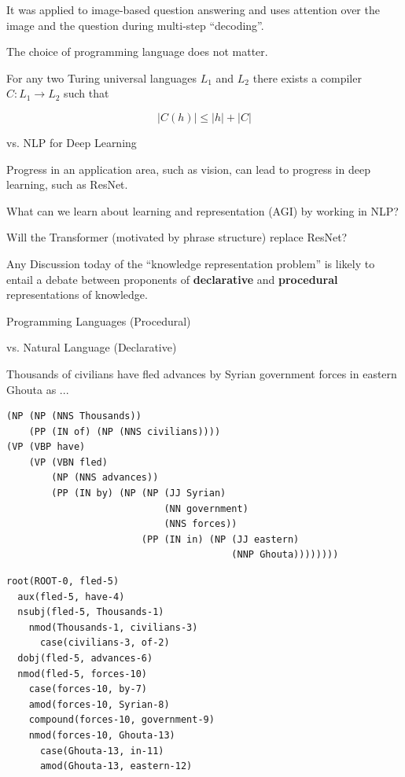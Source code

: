 {\vfill
It was applied to image-based question answering and uses attention over the image and the question during multi-step ``decoding''.


The choice of programming language does not matter.

\vfill
For any two Turing universal languages $L_1$ and $L_2$ there exists a compiler $C: L_1 \rightarrow L_2$ such that

$$|C(h)| \leq |h| + |C|$$

{vs. NLP for Deep Learning}

Progress in an application area, such as vision, can lead to progress in deep learning, such as ResNet.

\vfill
What can we learn about learning and representation (AGI) by working in NLP?

\vfill
Will the Transformer (motivated by phrase structure) replace ResNet?


Any Discussion today of the ``knowledge representation problem'' is likely to entail a debate between proponents of {\bf declarative} and {\bf procedural} representations of knowledge.

\vfill
{}

\vfill
Programming Languages (Procedural)

\vfill
vs. Natural Language (Declarative)


Thousands of civilians have fled advances by Syrian government forces in eastern Ghouta as ...

\begin{verbatim}
(NP (NP (NNS Thousands))
    (PP (IN of) (NP (NNS civilians))))
(VP (VBP have)
    (VP (VBN fled)
        (NP (NNS advances))
        (PP (IN by) (NP (NP (JJ Syrian)
                            (NN government)
                            (NNS forces))
                        (PP (IN in) (NP (JJ eastern)
                                        (NNP Ghouta))))))))
\end{verbatim}


\begin{verbatim}
root(ROOT-0, fled-5)
  aux(fled-5, have-4)
  nsubj(fled-5, Thousands-1)
    nmod(Thousands-1, civilians-3)
      case(civilians-3, of-2)
  dobj(fled-5, advances-6)
  nmod(fled-5, forces-10)
    case(forces-10, by-7)
    amod(forces-10, Syrian-8)
    compound(forces-10, government-9)
    nmod(forces-10, Ghouta-13)
      case(Ghouta-13, in-11)
      amod(Ghouta-13, eastern-12)
\end{verbatim}

}

